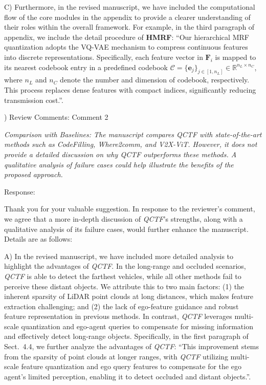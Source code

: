 \documentclass[12pt,a4paper]{article}
\begin{document}
C) Furthermore, in the revised manuscript, we have included the computational flow of the core modules in the appendix to provide a clearer understanding of their roles within the overall framework. For example, in the third paragraph of appendix, we include the detail procedure of \textbf{HMRF}: ``Our hierarchical MRF quantization adopts the VQ-VAE mechanism to compress continuous features into discrete representations. Specifically, each feature vector in $\mathbf{F}_i$ is mapped to its nearest codebook entry in a predefined codebook $\mathcal{C}=\{\mathbf{e}_j\}_{j\in[1,n_L]}\in \mathbb{R}^{n_L\times n_C}$, where $n_L$ and $n_C$ denote the number and dimension of codebook, respectively. This process replaces dense features with compact indices, significantly reducing transmission cost.''.


\vspace{4ex}
) Review Comments: Comment 2

\textit{Comparison with Baselines: The manuscript compares QCTF with state-of-the-art methods such as CodeFilling, Where2comm, and V2X-ViT. However, it does not provide a detailed discussion on why QCTF outperforms these methods. A qualitative analysis of failure cases could help illustrate the benefits of the proposed approach.}

\noindent Response:

Thank you for your valuable suggestion. In response to the reviewer's comment, we agree that a more in-depth discussion of \emph{QCTF}'s strengths, along with a qualitative analysis of its failure cases, would further enhance the manuscript.
Details are as follows:

A) In the revised manuscript, we have included more detailed analysis to highlight the advantages of \emph{QCTF}.
In the long-range and occluded scenarios, \emph{QCTF} is able to detect the farthest vehicles, while all other methods fail to perceive these distant objects. We attribute this to two main factors: (1) the inherent sparsity of LiDAR point clouds at long distances, which makes feature extraction challenging; and (2) the lack of ego-feature guidance and robust feature representation in previous methods. In contrast, \emph{QCTF} leverages multi-scale quantization and ego-agent queries to compensate for missing information and effectively detect long-range objects.
Specifically, in the first paragraph of Sect.~4.4, we further analyze the advantages of \emph{QCTF}: ``This improvement stems from the sparsity of point clouds at longer ranges, with \emph{QCTF} utilizing multi-scale feature quantization and ego query features to compensate for the ego agent's limited perception, enabling it to detect occluded and distant objects.''.
\end{document}
